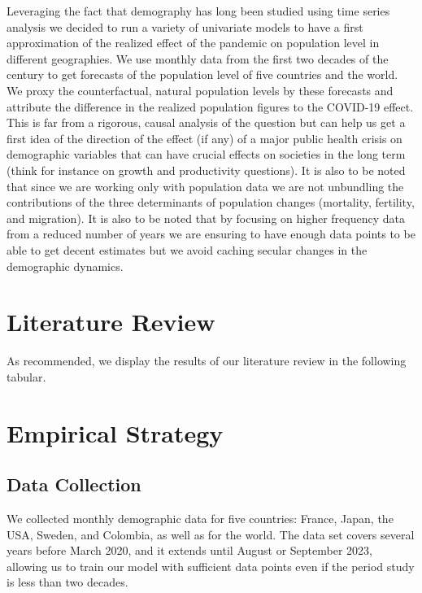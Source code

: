 \documentclass[hidelinks,11pts]{article}
\DeclareMathOperator{\1}{\mathbbm{1}}
\begin{document}
Leveraging the fact that demography has long been studied using time series analysis \cite[being a seminal work in the subject]{saboia1974modeling} we decided to run a variety of univariate models to have a first approximation of the realized effect of the pandemic on population level in different geographies. 
We use monthly data from the first two decades of the century to get forecasts of the population level of five countries and the world. 
We proxy the counterfactual, natural population levels by these forecasts and attribute the difference in the realized population figures to the COVID-19 effect. 
This is far from a rigorous, causal analysis of the question but can help us get a first idea of the direction of the effect (if any) of a major public health crisis on demographic variables that can have crucial effects on societies in the long term (think for instance on growth and productivity questions).
It is also to be noted that since we are working only with population data we are not unbundling the contributions of the three determinants of population changes (mortality, fertility, and migration). 
It is also to be noted that by focusing on higher frequency data from a reduced number of years we are ensuring to have enough data points to be able to get decent estimates but we avoid caching secular changes in the demographic dynamics. 





\section{Literature Review}
As recommended, we display the results of our literature review in the following tabular. 



\section{Empirical Strategy}

\subsection{Data Collection}
We collected monthly demographic data for five countries: France, Japan, the USA, Sweden, and Colombia, as well as for the world. 
The data set covers several years before March 2020, and it extends until August or September 2023, allowing us to train our model with sufficient data points even if the period study is less than two decades.%
\end{document}
